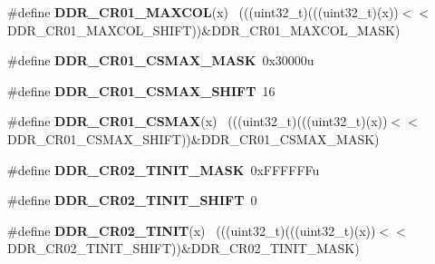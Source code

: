 \begin{DoxyCompactItemize}
\item 
\hypertarget{group___d_d_r___register___masks_gab25898e2705a21ac896f9cc18e554bd9}{}\#define {\bfseries D\+D\+R\+\_\+\+C\+R01\+\_\+\+M\+A\+X\+C\+O\+L}(x)                                          ~(((uint32\+\_\+t)(((uint32\+\_\+t)(x))$<$$<$D\+D\+R\+\_\+\+C\+R01\+\_\+\+M\+A\+X\+C\+O\+L\+\_\+\+S\+H\+I\+F\+T))\&D\+D\+R\+\_\+\+C\+R01\+\_\+\+M\+A\+X\+C\+O\+L\+\_\+\+M\+A\+S\+K)\label{group___d_d_r___register___masks_gab25898e2705a21ac896f9cc18e554bd9}

\item 
\hypertarget{group___d_d_r___register___masks_ga813bcee89f36622a7890773f2a9a9d9e}{}\#define {\bfseries D\+D\+R\+\_\+\+C\+R01\+\_\+\+C\+S\+M\+A\+X\+\_\+\+M\+A\+S\+K}~0x30000u\label{group___d_d_r___register___masks_ga813bcee89f36622a7890773f2a9a9d9e}

\item 
\hypertarget{group___d_d_r___register___masks_gab7633c0fa935b3e85f17cb62e9e884be}{}\#define {\bfseries D\+D\+R\+\_\+\+C\+R01\+\_\+\+C\+S\+M\+A\+X\+\_\+\+S\+H\+I\+F\+T}~16\label{group___d_d_r___register___masks_gab7633c0fa935b3e85f17cb62e9e884be}

\item 
\hypertarget{group___d_d_r___register___masks_ga9cd5f5659a57509eae9a20ec15d26f03}{}\#define {\bfseries D\+D\+R\+\_\+\+C\+R01\+\_\+\+C\+S\+M\+A\+X}(x)                                            ~(((uint32\+\_\+t)(((uint32\+\_\+t)(x))$<$$<$D\+D\+R\+\_\+\+C\+R01\+\_\+\+C\+S\+M\+A\+X\+\_\+\+S\+H\+I\+F\+T))\&D\+D\+R\+\_\+\+C\+R01\+\_\+\+C\+S\+M\+A\+X\+\_\+\+M\+A\+S\+K)\label{group___d_d_r___register___masks_ga9cd5f5659a57509eae9a20ec15d26f03}

\item 
\hypertarget{group___d_d_r___register___masks_ga1e9da563886a3ad6f56810ad574a30b8}{}\#define {\bfseries D\+D\+R\+\_\+\+C\+R02\+\_\+\+T\+I\+N\+I\+T\+\_\+\+M\+A\+S\+K}~0x\+F\+F\+F\+F\+F\+Fu\label{group___d_d_r___register___masks_ga1e9da563886a3ad6f56810ad574a30b8}

\item 
\hypertarget{group___d_d_r___register___masks_ga589d6e1a34abb9d902a16802280659e9}{}\#define {\bfseries D\+D\+R\+\_\+\+C\+R02\+\_\+\+T\+I\+N\+I\+T\+\_\+\+S\+H\+I\+F\+T}~0\label{group___d_d_r___register___masks_ga589d6e1a34abb9d902a16802280659e9}

\item 
\hypertarget{group___d_d_r___register___masks_gab02bf065328e8dfe2bc4ed70def69330}{}\#define {\bfseries D\+D\+R\+\_\+\+C\+R02\+\_\+\+T\+I\+N\+I\+T}(x)                                            ~(((uint32\+\_\+t)(((uint32\+\_\+t)(x))$<$$<$D\+D\+R\+\_\+\+C\+R02\+\_\+\+T\+I\+N\+I\+T\+\_\+\+S\+H\+I\+F\+T))\&D\+D\+R\+\_\+\+C\+R02\+\_\+\+T\+I\+N\+I\+T\+\_\+\+M\+A\+S\+K)\label{group___d_d_r___register___masks_gab02bf065328e8dfe2bc4ed70def69330}


\end{DoxyCompactItemize}
